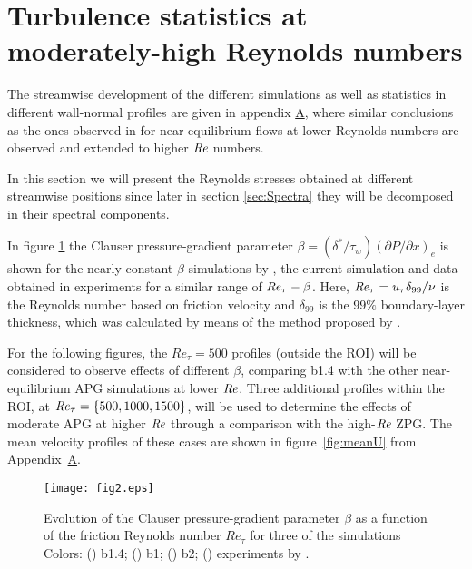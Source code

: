 \section{ Turbulence statistics at moderately-high Reynolds numbers} \label{sec:RS_peaks_and_exp}

The streamwise development of the different simulations as well as statistics in different wall-normal profiles are given in appendix \hyperlink{AppA}{A}, where similar conclusions as the ones observed in \cite{bobke2017} for near-equilibrium flows at lower Reynolds numbers are observed and extended to higher $\mbox{\textit{Re}}$ numbers. 

In this section we will present the Reynolds stresses obtained at different streamwise positions since later in section \ref{sec:Spectra} they will be decomposed in their spectral components.

In figure \ref{fig:beta} the Clauser pressure-gradient parameter $\beta=(\delta^*/\tau_w)  (\partial P/\partial x)_{e} $ is shown for the nearly-constant-$\beta$ simulations by \cite{bobke2017}, the current simulation and data obtained in experiments \citep{MTL_expSANMIGUEL} for a similar range of $\mbox{\textit{Re}}_{\tau}-\beta$. Here, $\mbox{\textit{Re}}_{\tau}=u_{\tau}\delta_{99}/\nu$ is the Reynolds number based on friction velocity and $\delta_{99}$ is the $99\%$ boundary-layer thickness, which was calculated by means of the method proposed by \cite{diagnostic_Vinuesa}.

For the following figures, the $Re_{\tau}=500$ profiles (outside the ROI) will be considered to observe effects of different $\beta$, comparing b1.4 with the other near-equilibrium APG simulations at lower $\mbox{\textit{Re}}$. Three additional profiles within the ROI, at $\mbox{\textit{Re}}_{\tau}=\{500, 1000, 1500\}$, will be used to determine the effects of moderate APG at higher $\mbox{\textit{Re}}$ through a comparison with the high-$\mbox{\textit{Re}}$ ZPG. The mean velocity profiles of these cases are shown in figure~\ref{fig:meanU} from Appendix~\hyperlink{AppA}{A}.

\begin{figure}
\centering
\texttt{[image: fig2.eps]}
  \caption{Evolution of the Clauser pressure-gradient parameter $\beta$ as a function of the friction Reynolds number $Re_{\tau}$ for three of the simulations Colors: (\protect\orangeline) b1.4; (\protect\redline) b1; (\protect\greenline) b2; (\protect\redcircle) experiments by \cite{MTL_expSANMIGUEL}.}
\label{fig:beta}
\end{figure}

